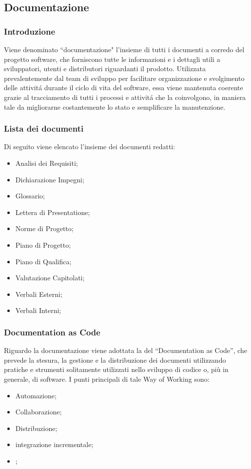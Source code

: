 \subsection{Documentazione}
\subsubsection{Introduzione}
Viene denominato ``documentazione" l'insieme di tutti i documenti a corredo del progetto software, che forniscono tutte le informazioni e i dettagli utili a sviluppatori, utenti e distributori riguardanti il prodotto. Utilizzata prevalentemente dal team di sviluppo per facilitare organizzazione e svolgimento delle attivitá durante il ciclo di vita del software, essa viene mantenuta coerente grazie al tracciamento di tutti i processi e attivitá che la coinvolgono, in maniera tale da migliorarne costantemente lo stato e semplificare la manutenzione.
\subsubsection{Lista dei documenti}
Di seguito viene elencato l'insieme dei documenti redatti:
\begin{itemize}
    \item Analisi dei Requisiti;
    \item Dichiarazione Impegni;
    \item Glossario;
    \item Lettera di Presentatione;
    \item Norme di Progetto;
    \item Piano di Progetto;
    \item Piano di Qualifica;
    \item Valutazione Capitolati;
    \item Verbali Esterni;
    \item Verbali Interni;
\end{itemize}

\subsubsection{Documentation as Code}
Riguardo la documentazione viene adottata la  del ``Documentation as Code'', che prevede la stesura, la gestione e la distribuzione dei documenti utilizzando pratiche e strumenti solitamente utilizzati nello sviluppo di codice o, più in generale, di software. I punti principali di tale Way of Working sono:
\begin{itemize}
    \item Automazione;
    \item Collaborazione;
    \item Distribuzione;
    \item integrazione incrementale;
    \item {};
\end{itemize}

